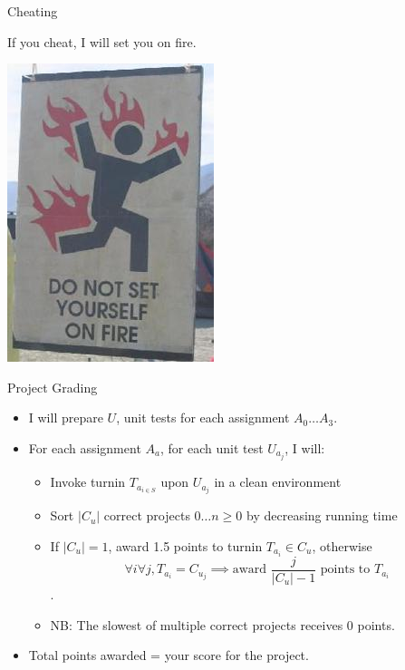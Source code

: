\documentclass{beamer}
\begin{document}
\begin{frame}{Cheating}
\begin{center}
If you cheat, I will set you on fire.
\vspace{.5in}

\includegraphics[scale=0.5]{images/setonfire.jpg}
\end{center}
\end{frame}

\begin{frame}{Project Grading}
\begin{itemize}
\item I will prepare $U$, unit tests for each assignment $A_0 \dotsc A_3$.
\item For each assignment $A_a$, for each unit test $U_{a_j}$, I will:
\begin{itemize}
\item Invoke turnin $T_{a_{i \in S}}$ upon $U_{a_j}$ in a clean environment
\item Sort $|C_u|$ correct projects $0 \dotsc n\ge 0$ by decreasing running time
\item If $|C_u| = 1$, award 1.5 points to turnin $T_{a_i} \in C_u$, otherwise
\begin{equation}
\forall i \forall j, T_{a_i} = C_{u_j} \implies \text{award } \frac{j}{|C_u| - 1} \text{ points to } T_{a_i}
\nonumber
\end{equation}.
\item NB: The slowest of multiple correct projects receives 0 points.
\end{itemize}
\item Total points awarded = your score for the project.
\end{itemize}
\end{frame}
\end{document}
